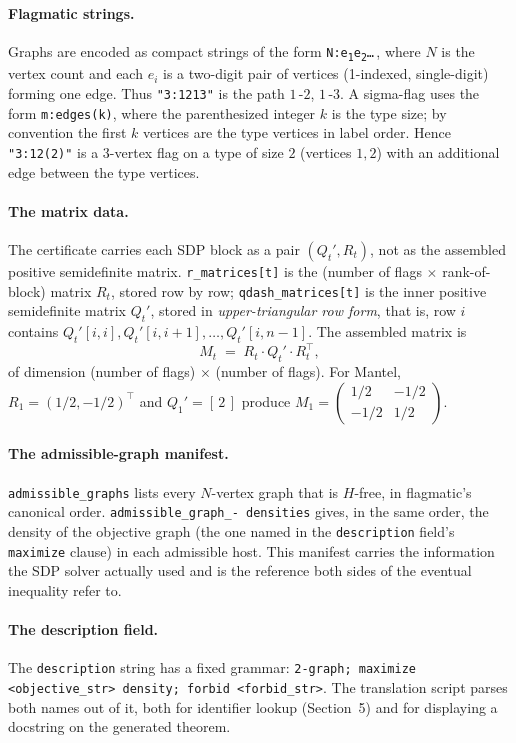 \documentclass[11pt]{article}
\begin{document}
\paragraph{Flagmatic strings.}
Graphs are encoded as compact strings of the form
\texttt{N:e\textsubscript{1}e\textsubscript{2}\ldots}\,, where $N$ is the
vertex count and each $e_i$ is a two-digit pair of vertices
(1-indexed, single-digit) forming one edge. Thus
\texttt{"3:1213"} is the path $1$\,-$2$, $1$\,-$3$. A sigma-flag uses
the form \texttt{m:edges(k)}, where the parenthesized integer $k$ is the
type size; by convention the first $k$ vertices are the type vertices in
label order. Hence \texttt{"3:12(2)"} is a $3$-vertex flag on a type
of size $2$ (vertices $1,2$) with an additional edge between the type
vertices.

\paragraph{The matrix data.}
The certificate carries each SDP block as a pair
$(Q_t', R_t)$, not as the assembled positive semidefinite matrix.
\texttt{r\_matrices[t]} is the (number of flags $\times$ rank-of-block)
matrix $R_t$, stored row by row; \texttt{qdash\_matrices[t]} is the
inner positive semidefinite matrix $Q_t'$, stored in
\emph{upper-triangular row form}, that is, row $i$ contains
$Q_t'[i,i], Q_t'[i,i+1], \ldots, Q_t'[i,n-1]$. The assembled matrix is
\[
  M_t \;=\; R_t \cdot Q_t' \cdot R_t^\top,
\]
of dimension (number of flags) $\times$ (number of flags). For Mantel,
$R_1 = (1/2, -1/2)^\top$ and $Q_1' = [\,2\,]$ produce
$M_1 = \begin{pmatrix} 1/2 & -1/2 \\ -1/2 & 1/2 \end{pmatrix}$.

\paragraph{The admissible-graph manifest.}
\texttt{admissible\_graphs} lists every $N$-vertex graph that is
$H$-free, in flagmatic's canonical order. \texttt{admissible\_graph\_-
densities} gives, in the same order, the density of the objective
graph (the one named in the \texttt{description} field's
\texttt{maximize} clause) in each admissible host. This manifest carries
the information the SDP solver actually used and is the reference both
sides of the eventual inequality refer to.

\paragraph{The description field.}
The \texttt{description} string has a fixed grammar:
\texttt{2-graph; maximize <objective\_str> density; forbid <forbid\_str>}.
The translation script parses both names out of it, both for identifier
lookup (Section~5) and for displaying a docstring on the generated
theorem.
\end{document}
